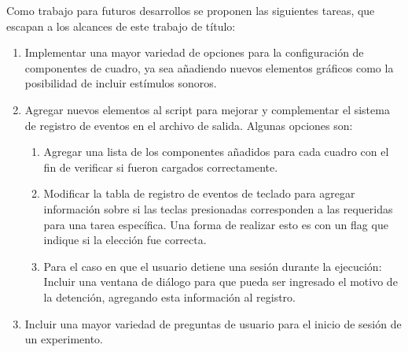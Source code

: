 \documentclass[\main/main.tex]{subfiles}
\begin{document}
		Como trabajo para futuros desarrollos se proponen las siguientes tareas, que escapan a los alcances de este trabajo de título:
		\begin{enumerate}\setlength\itemsep{-0.2em}
			\item Implementar una mayor variedad de opciones para la configuración de componentes de cuadro, ya sea añadiendo nuevos elementos gráficos como la posibilidad de incluir estímulos sonoros.

			\item Agregar nuevos elementos al script para mejorar y complementar el sistema de registro de eventos en el archivo de salida. Algunas opciones son:
				\begin{enumerate}\setlength\itemsep{-0.2em}
					\item Agregar una lista de los componentes añadidos para cada cuadro con el fin de verificar si fueron cargados correctamente.

					\item Modificar la tabla de registro de eventos de teclado para agregar información sobre si las teclas presionadas corresponden a las requeridas para una tarea específica. Una forma de realizar esto es con un flag que indique si la elección fue correcta. 

					\item Para el caso en que el usuario detiene una sesión durante la ejecución: Incluir una ventana de diálogo para que pueda ser ingresado el motivo de la detención, agregando esta información al registro. 

				\end{enumerate}

			\item Incluir una mayor variedad de preguntas de usuario para el inicio de sesión de un experimento. 

		\end{enumerate}
	
\end{document}
